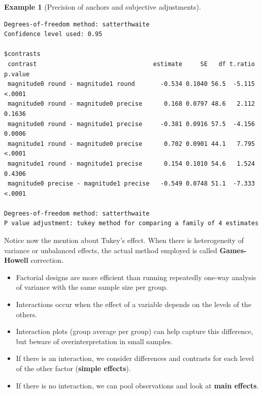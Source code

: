 \documentclass[
  11pt,
  letterpaper,
]{scrbook}
\providecommand{\tightlist}{%
  \setlength{\itemsep}{0pt}\setlength{\parskip}{0pt}}\usepackage{longtable,booktabs,array}
\theoremstyle{definition}
\theoremstyle{definition}
\newtheorem{example}{Example}[chapter]
\theoremstyle{remark}
\begin{document}
\begin{example}[Precision of anchors and subjective
adjustments]
\begin{verbatim}
Degrees-of-freedom method: satterthwaite 
Confidence level used: 0.95 

$contrasts
 contrast                                estimate     SE   df t.ratio p.value
 magnitude0 round - magnitude1 round       -0.534 0.1040 56.5  -5.115  <.0001
 magnitude0 round - magnitude0 precise      0.168 0.0797 48.6   2.112  0.1636
 magnitude0 round - magnitude1 precise     -0.381 0.0916 57.5  -4.156  0.0006
 magnitude1 round - magnitude0 precise      0.702 0.0901 44.1   7.795  <.0001
 magnitude1 round - magnitude1 precise      0.154 0.1010 54.6   1.524  0.4306
 magnitude0 precise - magnitude1 precise   -0.549 0.0748 51.1  -7.333  <.0001

Degrees-of-freedom method: satterthwaite 
P value adjustment: tukey method for comparing a family of 4 estimates 
\end{verbatim}

Notice now the mention about Tukey's effect. When there is heterogeneity
of variance or unbalanced effects, the actual method employed is called
\textbf{Games-Howell} correction.

\end{example}

\begin{tcolorbox}[enhanced jigsaw, opacityback=0, opacitybacktitle=0.6, leftrule=.75mm, colbacktitle=quarto-callout-important-color!10!white, breakable, toptitle=1mm, bottomrule=.15mm, title=\textcolor{quarto-callout-important-color}{\faExclamation}\hspace{0.5em}{\textbf{Summary}}, coltitle=black, colframe=quarto-callout-important-color-frame, colback=white, left=2mm, toprule=.15mm, arc=.35mm, bottomtitle=1mm, titlerule=0mm, rightrule=.15mm]

\begin{itemize}
\tightlist
\item
  Factorial designs are more efficient than running repeatedly one-way
  analysis of variance with the same sample size per group.
\item
  Interactions occur when the effect of a variable depends on the levels
  of the others.
\item
  Interaction plots (group average per group) can help capture this
  difference, but beware of overinterpretation in small samples.
\item
  If there is an interaction, we consider differences and contrasts for
  each level of the other factor (\textbf{simple effects}).
\item
  If there is no interaction, we can pool observations and look at
  \textbf{main effects}.
\end{itemize}

\end{tcolorbox}
\end{document}
